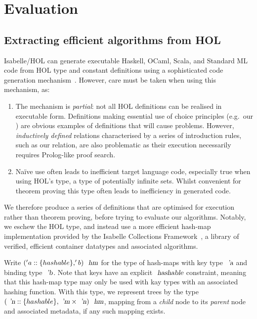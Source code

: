 \documentclass[sigconf]{acmart}
\begin{document}
\section{Evaluation}\label{sec:evaluation}

\subsection{Extracting efficient algorithms from HOL}

Isabelle/HOL can generate executable Haskell, OCaml, Scala, and Standard ML code from HOL type and constant definitions using a sophisticated code generation mechanism~\cite{DBLP:conf/flops/HaftmannN10}.
However,  care must be taken when using this mechanism, as:
\begin{enumerate}
\item
The mechanism is \emph{partial}: not all HOL definitions can be realised in executable form.
Definitions making essential use of choice principles (e.g.~our ) are obvious examples of definitions that will cause problems.
However, \emph{inductively defined} relations characterised by a series of introduction rules, such as our  relation, are also problematic as their execution necessarily requires Prolog-like proof search.
\item
Na\"{i}ve use often leads to inefficient target language code, especially true when using HOL's  type, a type of potentially infinite sets.
Whilst convenient for theorem proving this type often leads to inefficiency in generated code.
\end{enumerate}

We therefore produce a series of definitions that are optimised for execution rather than theorem proving, before trying to evaluate our algorithms.
Notably, we eschew the HOL  type, and instead use a more efficient hash-map implementation provided by the Isabelle Collections Framework~\cite{DBLP:conf/itp/LammichL10}, a library of verified, efficient container datatypes and associated algorithms.

Write $('a::\{hashable\}, 'b)\ \isa{hm}$ for the type of hash-maps with key type $\isa{'a}$ and binding type $\isa{'b}$.
Note that keys have an explicit $\isa{hashable}$ constraint, meaning that this hash-map type may only be used with kay types with an associated hashing function.
With this type, we represent trees by the type $(\isa{'n}::\{hashable\}, \isa{'m} \times \isa{'n})\ \isa{hm}$, mapping from a \emph{child} node to its \emph{parent} node and associated metadata, if any such mapping exists.
\end{document}
